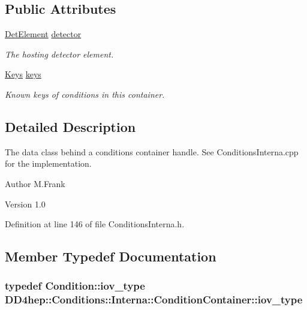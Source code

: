 \subsection*{Public Attributes}
\begin{DoxyCompactItemize}
\item 
\hyperlink{namespace_d_d4hep_a21dd977310ff183f61ca6ae14b59a989}{DetElement} \hyperlink{class_d_d4hep_1_1_conditions_1_1_interna_1_1_condition_container_aea33e2b2bf7d2ee4db38f87d2f231a2e}{detector}
\begin{DoxyCompactList}\small\item\em The hosting detector element. \item\end{DoxyCompactList}\item 
\hyperlink{class_d_d4hep_1_1_conditions_1_1_interna_1_1_condition_container_a01f9461850ee260a6c76646f9619c8bb}{Keys} \hyperlink{class_d_d4hep_1_1_conditions_1_1_interna_1_1_condition_container_a80876b929c712092fb1e036e1916f621}{keys}
\begin{DoxyCompactList}\small\item\em Known keys of conditions in this container. \item\end{DoxyCompactList}\end{DoxyCompactItemize}


\subsection{Detailed Description}
The data class behind a conditions container handle. See ConditionsInterna.cpp for the implementation.

\begin{DoxyAuthor}{Author}
M.Frank 
\end{DoxyAuthor}
\begin{DoxyVersion}{Version}
1.0 
\end{DoxyVersion}


Definition at line 146 of file ConditionsInterna.h.

\subsection{Member Typedef Documentation}
\hypertarget{class_d_d4hep_1_1_conditions_1_1_interna_1_1_condition_container_aa697bd92da7a05031b5eef63bb9f000b}{
\subsubsection[{iov\_\-type}]{\setlength{\rightskip}{0pt plus 5cm}typedef {\bf Condition::iov\_\-type} {\bf DD4hep::Conditions::Interna::ConditionContainer::iov\_\-type}}}
\label{class_d_d4hep_1_1_conditions_1_1_interna_1_1_condition_container_aa697bd92da7a05031b5eef63bb9f000b}


